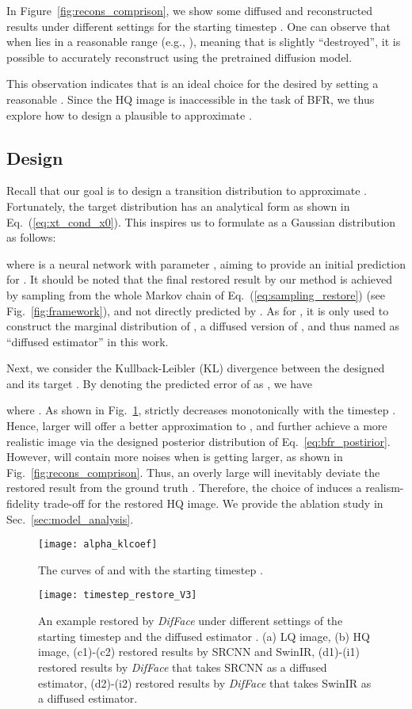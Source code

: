 \documentclass[10pt,twocolumn,letterpaper]{article}
\begin{document}
In Figure~\ref{fig:recons_comprison}, we show some diffused and reconstructed results under different settings for the starting timestep . One can observe that when  lies in a reasonable range (e.g., ), meaning that  is slightly ``destroyed'', it is possible to accurately reconstruct  using the pretrained diffusion model.

This observation indicates that  is an ideal choice for the desired  by setting a reasonable . Since the HQ image  is inaccessible in the task of BFR, we thus explore how to design a plausible  to approximate .

\subsection{Design}
Recall that our goal is to design a transition distribution  to approximate . Fortunately, the target distribution  has an analytical form as shown in Eq.~(\ref{eq:xt_cond_x0}). This inspires us to formulate  as a Gaussian distribution as follows:

where  is a neural network with parameter , aiming to provide an initial prediction for . It should be noted that the final restored result by our method is achieved by sampling from the whole Markov chain of Eq.~(\ref{eq:sampling_restore}) (see Fig.~\ref{fig:framework}), and not directly predicted by . As for , it is only used to construct the marginal distribution of , a diffused version of , and thus named as ``diffused estimator'' in this work.

Next, we consider the Kullback-Leibler (KL) divergence between the designed  and its target . By denoting the predicted error of  as , we have

where . As shown in Fig.~\ref{fig:curve_alpha},  strictly decreases monotonically with the timestep . Hence, larger  will offer a better approximation to , and further achieve a more realistic image via the designed posterior distribution of Eq.~\eqref{eq:bfr_postirior}. However,  will contain more noises when  is getting larger, as shown in Fig.~\ref{fig:recons_comprison}. Thus, an overly large  will inevitably deviate the restored result from the ground truth . Therefore, the choice of  induces a realism-fidelity trade-off for the restored HQ image. We provide the ablation study in Sec.~\ref{sec:model_analysis}.
\begin{figure}[t]
    \centering
    \vspace{-3mm}
    \texttt{[image: alpha\_klcoef]}
    \caption{The curves of  and  with the starting timestep .}
    \label{fig:curve_alpha}
\end{figure}
\begin{figure*}[t]
    \centering
    \texttt{[image: timestep\_restore\_V3]}
    \caption{An example restored by \textit{DifFace} under different settings of the starting timestep  and the diffused estimator . (a) LQ image, (b) HQ image, (c1)-(c2) restored results by SRCNN and SwinIR, (d1)-(i1) restored results by \textit{DifFace} that takes SRCNN as a diffused estimator, (d2)-(i2) restored results by \textit{DifFace} that takes SwinIR as a diffused estimator.}
    \label{fig:time_restore}
\end{figure*}
\end{document}
